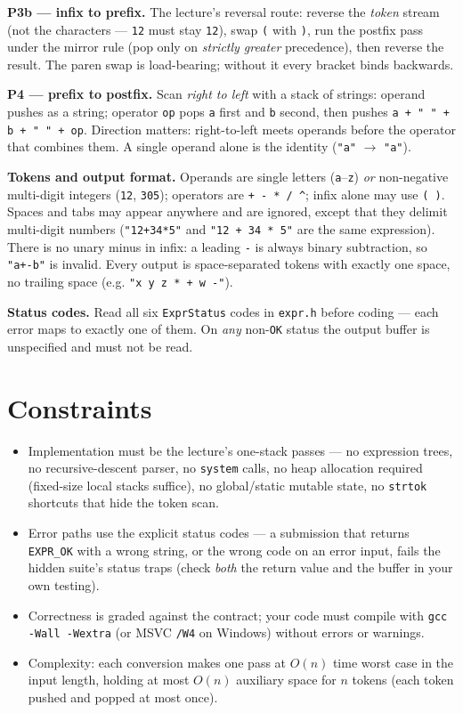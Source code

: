 \documentclass[11pt]{article}
\begin{document}
\textbf{P3b --- infix to prefix.} The lecture's reversal route: reverse the \emph{token} stream (not the characters --- \texttt{12} must stay \texttt{12}), swap \texttt{(} with \texttt{)}, run the postfix pass under the mirror rule (pop only on \emph{strictly greater} precedence), then reverse the result. The paren swap is load-bearing; without it every bracket binds backwards.

\textbf{P4 --- prefix to postfix.} Scan \emph{right to left} with a stack of strings: operand pushes as a string; operator \texttt{op} pops \texttt{a} first and \texttt{b} second, then pushes \texttt{a + " " + b + " " + op}. Direction matters: right-to-left meets operands before the operator that combines them. A single operand alone is the identity (\texttt{"a"} $\to$ \texttt{"a"}).

\textbf{Tokens and output format.} Operands are single letters (\texttt{a}--\texttt{z}) \emph{or} non-negative multi-digit integers (\texttt{12}, \texttt{305}); operators are \texttt{+ - * / \^{}}; infix alone may use \texttt{( )}. Spaces and tabs may appear anywhere and are ignored, except that they delimit multi-digit numbers (\texttt{"12+34*5"} and \texttt{"12 + 34 * 5"} are the same expression). There is no unary minus in infix: a leading \texttt{-} is always binary subtraction, so \texttt{"a+-b"} is invalid. Every output is space-separated tokens with exactly one space, no trailing space (e.g. \texttt{"x y z * + w -"}).

\textbf{Status codes.} Read all six \texttt{ExprStatus} codes in \texttt{expr.h} before coding --- each error maps to exactly one of them. On \emph{any} non-\texttt{OK} status the output buffer is unspecified and must not be read.

\section{Constraints}

\begin{itemize}
  \item Implementation must be the lecture's one-stack passes --- no expression trees, no recursive-descent parser, no \texttt{system} calls, no heap allocation required (fixed-size local stacks suffice), no global/static mutable state, no \texttt{strtok} shortcuts that hide the token scan.
  \item Error paths use the explicit status codes --- a submission that returns \texttt{EXPR\_OK} with a wrong string, or the wrong code on an error input, fails the hidden suite's status traps (check \emph{both} the return value and the buffer in your own testing).
  \item Correctness is graded against the contract; your code must compile with \texttt{gcc -Wall -Wextra} (or MSVC \texttt{/W4} on Windows) without errors or warnings.
  \item Complexity: each conversion makes one pass at $O(n)$ time worst case in the input length, holding at most $O(n)$ auxiliary space for $n$ tokens (each token pushed and popped at most once).
\end{itemize}
\end{document}
